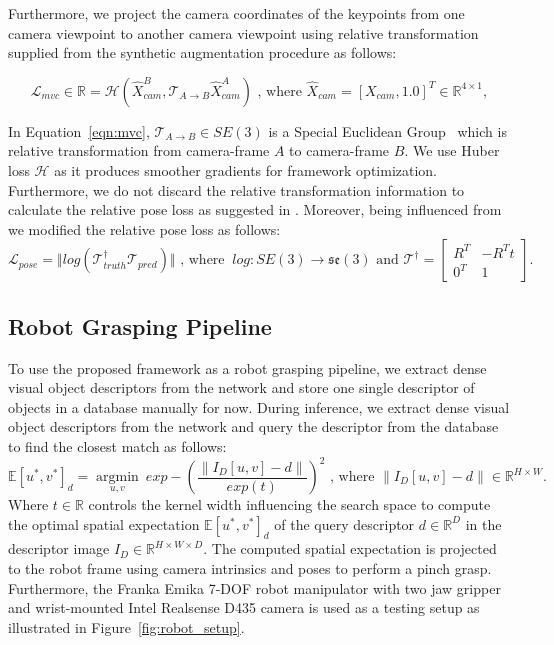 Furthermore, we project the camera coordinates of the keypoints from one camera viewpoint to another camera viewpoint using relative transformation supplied from the synthetic augmentation procedure as follows:

\begin{equation}
    \label{eqn:mvc}
    \mathcal{L}_{mvc} \in \mathbb{R} = \mathcal{H}(\hat{X}^B_{cam}, \mathcal{T}_{A \rightarrow B} \hat{X}^A_{cam}) \text{ , where  } \hat{X}_{cam}=[X_{cam}, 1.0]^T \in \mathbb{R}^{4 \times 1} ,
\end{equation}


In Equation~\ref{eqn:mvc}, $ \mathcal{T}_{A \rightarrow B} \in SE(3)$ is a Special Euclidean Group~\cite{thurston2014three} which
is relative transformation from camera-frame $A$ to camera-frame $B$. We use Huber loss $\mathcal{H}$ as it produces smoother gradients for framework optimization.
Furthermore, we do not discard the relative transformation information to calculate the relative pose loss as suggested in \cite{suwajanakorn2018discovery}.
Moreover, being influenced from \cite{zhao2020learning} we modified the relative pose loss as follows:
\begin{equation}
    \mathcal{L}_{pose} = \Vert log(\mathcal{T}_{truth}^{\dagger} \mathcal{T}_{pred}) \Vert \text{ , where  } \ log: SE(3) \rightarrow \mathfrak{se}(3) \text{ and } \mathcal{T}^{\dagger} = \begin{bmatrix}
        R^T & -R^T t \\
        0^T & 1
    \end{bmatrix}.
\end{equation}


\subsection{Robot Grasping Pipeline}
To use the proposed framework as a robot grasping pipeline, we extract dense visual object descriptors from the network and store
one single descriptor of objects in a database manually for now. During inference, we extract dense visual object descriptors from the network and
query the descriptor from the database to find the closest match as follows:
\begin{equation}
    \label{eqn:gaussian_kernel}
    \mathbb{E}{[u^*, v^*]_{d}} = \operatorname*{argmin}_{u, v} \ exp-\left(\dfrac{\|I_D[u, v] - d\|}{exp(t)}\right)^2 \text{ , where  } \|I_D[u, v] - d\| \in \mathbb{R}^{H \times W}.
\end{equation}
Where $t \in \mathbb{R}$ controls the kernel width influencing the search space to compute the optimal spatial expectation $\mathbb{E}{[u^*, v^*]_{d}}$ of
the query descriptor $d \in \mathbb{R}^D$ in the descriptor image $I_D \in \mathbb{R}^{H \times W \times D}$. The computed spatial expectation is projected to the robot frame using camera intrinsics and poses to perform a pinch grasp.
Furthermore, the Franka Emika 7-DOF robot manipulator with two jaw gripper and wrist-mounted Intel Realsense D435 camera is used as a testing setup as illustrated in Figure~\ref{fig:robot_setup}.

